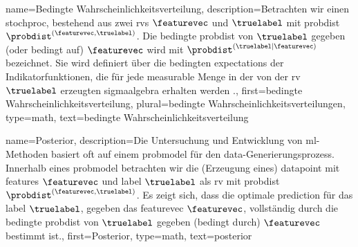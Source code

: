 {{{{
{
    name={Bedingte Wahrscheinlichkeitsverteilung}, 
    description={Betrachten wir 
        einen \gls{stochproc}, bestehend aus zwei \glspl{rv} $\featurevec$ und $\truelabel$ 
        mit \gls{probdist} $\probdist^{(\featurevec,\truelabel)}$. Die bedingte \gls{probdist} 
        von $\truelabel$ gegeben (oder bedingt auf) $\featurevec$ wird mit 
        $\probdist^{(\truelabel|\featurevec)}$ bezeichnet. Sie wird definiert über die bedingten 
        \glspl{expectation} der Indikatorfunktionen, die für jede \gls{measurable} Menge 
        in der von der \gls{rv} $\truelabel$ erzeugten \gls{sigmaalgebra} erhalten werden \cite{BillingsleyProbMeasure,KallenbergBook}.},
    first={bedingte Wahrscheinlichkeitsverteilung}, 
    plural={bedingte Wahrscheinlichkeitsverteilungen}, 
    type=math, 
    text={bedingte Wahrscheinlichkeitsverteilung}

}

{
    name={Posterior},
    description={Die Untersuchung und Entwicklung von \gls{ml}-Methoden basiert oft auf einem 
                 \gls{probmodel} für den \gls{data}-Generierungsprozess. Innerhalb eines 
                 \gls{probmodel} betrachten wir die (Erzeugung eines) \gls{datapoint} mit 
                 \glspl{feature} $\featurevec$ und \gls{label} $\truelabel$ als 
                 \gls{rv} mit \gls{probdist} $\probdist^{(\featurevec,\truelabel)}$. 
                 Es zeigt sich, dass die optimale \gls{prediction} für das \gls{label} 
                 $\truelabel$, gegeben das \gls{featurevec} $\featurevec$, vollständig 
                 durch die bedingte \gls{probdist} von $\truelabel$ gegeben (bedingt durch) 
                 $\featurevec$ bestimmt ist.},
    first={Posterior},
    type=math,
    text={posterior}
}


}}}}
